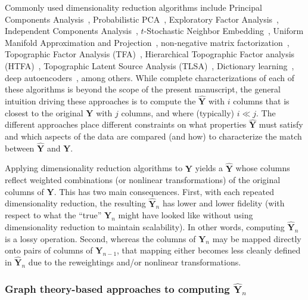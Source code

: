 \documentclass[english]{article}
\begin{document}
Commonly used dimensionality reduction algorithms include Principal
Components Analysis~\citep[PCA; ][]{Pear01}, Probabilistic
PCA~\citep[PPCA; ][]{TippBish99}, Exploratory Factor
Analysis~\citep[EFA; ][]{Spea04}, Independent Components
Analysis~\citep[ICA; ][]{JuttHera91, ComoEtal91}, $t$-Stochastic
Neighbor Embedding~\citep[$t$-SNE; ][]{MaatHint08}, Uniform Manifold
Approximation and Projection~\citep[UMAP; ][]{McInHeal18},
non-negative matrix factorization~\citep[NMF; ][]{LeeSeun99},
Topographic Factor Analysis (TFA)~\cite{MannEtal14b}, Hierarchical
Topographic Factor analysis (HTFA)~\cite{MannEtal18}, Topographic
Latent Source Analysis (TLSA)~\cite{GersEtal11}, Dictionary
learning~\citep{MairEtal09a, MairEtal09b}, deep
autoencoders~\citep{HintSala06}, among others.  While complete
characterizations of each of these algorithms is beyond the scope of
the present manuscript, the general intuition driving these
approaches is to compute the $\hat{\mathbf{Y}}$ with $i$ columns that
is closest to the original $\mathbf{Y}$ with $j$ columns, and where
(typically) $i \ll j$.  The different approaches place different
constraints on what properties $\hat{\mathbf{Y}}$ must satisfy and
which aspects of the data are compared (and how) to characterize the
match between $\hat{\mathbf{Y}}$ and  $\mathbf{Y}$.

Applying dimensionality reduction algorithms to $\mathbf{Y}$ yields a
$\hat{\mathbf{Y}}$ whose columns reflect weighted combinations (or
nonlinear transformations) of the original columns of $\mathbf{Y}$.
This has two main consequences.  First, with each repeated
dimensionality reduction, the resulting $\hat{\mathbf{Y}}_n$ has lower
and lower fidelity (with respect to what the ``true'' $\mathbf{Y}_n$
might have looked like without using dimensionality reduction to
maintain scalability).  In other words, computing $\hat{\mathbf{Y}}_n$
is a lossy operation.  Second, whereas the columns of $\mathbf{Y}_n$
may be mapped directly onto pairs of columns of $\mathbf{Y}_{n-1}$,
that mapping either becomes less cleanly defined in
$\hat{\mathbf{Y}}_n$ due to the reweightings and/or nonlinear
transformations.

\subsubsection*{Graph theory-based approaches to computing
  $\hat{\mathbf{Y}}_n$}
\end{document}

